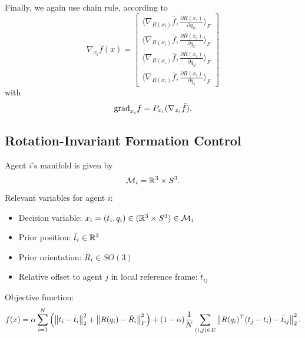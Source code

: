 Finally, we again use chain rule, according to
\begin{equation}
    \nabla_{x_i} \bar{f}(x) = \begin{bmatrix}
        \langle \nabla_{R(x_i)} \bar{f}, \frac{\partial R(x_i)}{\partial q_w} \rangle_F
        \\
        \langle \nabla_{R(x_i)} \bar{f}, \frac{\partial R(x_i)}{\partial q_x} \rangle_F
        \\
        \langle \nabla_{R(x_i)} \bar{f}, \frac{\partial R(x_i)}{\partial q_y} \rangle_F
        \\
        \langle \nabla_{R(x_i)} \bar{f}, \frac{\partial R(x_i)}{\partial q_z} \rangle_F
    \end{bmatrix}
\end{equation}
with
\begin{equation}
    \text{grad}_{x_i} f = P_{x_i} (\nabla_{x_i} \bar{f}).
\end{equation}


\subsection{Rotation-Invariant Formation Control}
Agent $i$'s manifold is given by
\begin{equation}
    \mathcal{M}_i = \mathbb{R}^{3} \times S^3.
\end{equation}
Relevant variables for agent $i$:
\begin{itemize}
    \item Decision variable: $x_i = (t_i, q_i) \in (\mathbb{R}^{3} \times S^3) \in \mathcal{M}_i$
    \item Prior position: $\bar{t}_i \in \mathbb{R}^{3}$
    \item Prior orientation: $\bar{R}_i \in SO(3)$
    \item Relative offset to agent $j$ in local reference frame: $\tilde{t}_{ij}$
\end{itemize}

Objective function:
\begin{equation}
    f(x) = \alpha \sum_{i=1}^N \left( \left\lVert t_i - \bar{t}_i \right\rVert_2^2 + \left\lVert R(q_i) - \bar{R}_i \right\rVert_F^2 \right) + (1-\alpha) \frac{1}{N} \sum_{(i,j)\in E} \left\lVert R(q_i)^\top (t_j - t_i) - \tilde{t}_{ij} \right\rVert_2^2.
\end{equation}

